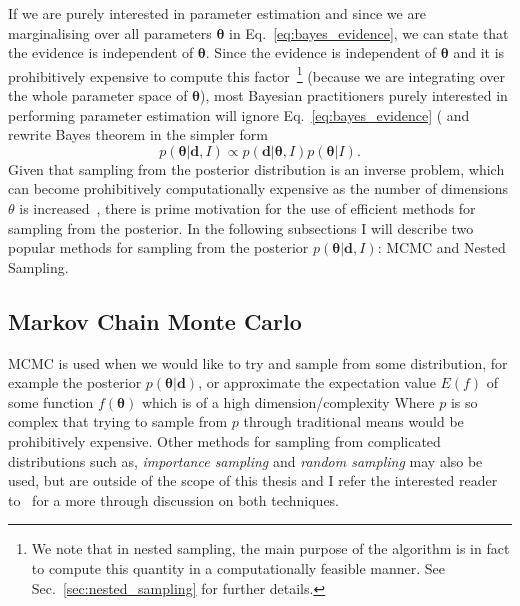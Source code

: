 %
%
If we are purely interested in parameter estimation and since 
we are marginalising over all parameters $\bm{\theta}$ 
in Eq.~\ref{eq:bayes_evidence}, 
we can state that the evidence is independent of $\bm{\theta}$. 
Since the evidence is independent of $\bm{\theta}$ and it is prohibitively 
expensive to compute this factor~\footnote{We note that in nested sampling, 
the main purpose of the algorithm is in fact to compute this 
quantity in a computationally feasible manner. 
See Sec.~\ref{sec:nested_sampling} for further details.} 
(because we are integrating over the whole 
parameter space of $\bm{\theta}$), most 
Bayesian practitioners purely interested in performing parameter estimation 
will ignore Eq.~\ref{eq:bayes_evidence} ( and rewrite Bayes theorem in 
the simpler form 
%
\begin{equation}
    p(\bm{\theta} | \bm{d}, I) \propto p(\bm{d} | \bm{\theta},I) p(\bm{\theta}|I).
\end{equation}
%
%
Given that sampling from the posterior distribution is an inverse 
problem, which can become prohibitively computationally expensive as 
the number of dimensions $\theta$ is increased~\cite{2019PASA...36...10T}, 
there is prime motivation 
for the use of efficient methods for sampling from the posterior. In 
the following subsections I will describe two popular methods for sampling from the posterior $p(\bm{\theta}|\bm{d},I)$: \ac{MCMC} and Nested Sampling.

\subsection{Markov Chain Monte Carlo}

%
\ac{MCMC} is used when we would like to try and sample from some distribution, 
for example the posterior $p(\bm{\theta}|\bm{d})$, or approximate the expectation value $E(f)$ of some function $f(\bm{\theta})$ which is of a high dimension/complexity
Where $p$ is so complex that trying to sample from $p$ through traditional means would be prohibitively expensive. Other methods for 
sampling from complicated distributions such 
as, \textit{importance sampling} and \textit{random sampling} may 
also be used, but are outside of the scope of this thesis and I refer the interested reader to~\cite{2019arXiv190912313S} for a more through 
discussion on both techniques.

